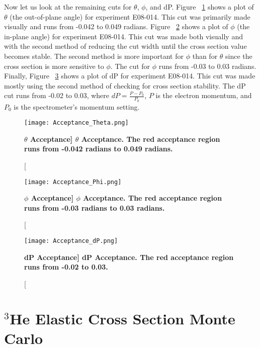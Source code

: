Now let us look at the remaining cuts for $\theta$, $\phi$, and dP. Figure ~\ref{fig:acceptance_th} shows a plot of $\theta$ (the out-of-plane angle) for experiment E08-014. This cut was primarily made visually and runs from -0.042 to 0.049 radians. Figure ~\ref{fig:acceptance_ph} shows a plot of $\phi$ (the in-plane angle) for experiment E08-014. This cut was made both visually and with the second method of reducing the cut width until the cross section value becomes stable. The second method is more important for $\phi$ than for $\theta$ since the cross section is more sensitive to $\phi$. The cut for $\phi$ runs from -0.03 to 0.03 radians. Finally, Figure ~\ref{fig:acceptance_dp} shows a plot of dP for experiment E08-014. This cut was made mostly using the second method of checking for cross section stability. The dP cut runs from -0.02 to 0.03, where $dP = \frac{P-P_0}{P_0}$, $P$ is the electron momentum, and $P_0$ is the spectrometer's momentum setting.

\begin{figure}[!ht]
\begin{center}
\texttt{[image: Acceptance\_Theta.png]}
\end{center}
\caption[\bf{$\theta$ Acceptance}]{
{\bf{$\theta$ Acceptance.}} The red acceptance region runs from -0.042 radians to 0.049 radians.}
\label{fig:acceptance_th}
\end{figure}

\begin{figure}[!ht]
\begin{center}
\texttt{[image: Acceptance\_Phi.png]}
\end{center}
\caption[\bf{$\phi$ Acceptance}]{
{\bf{$\phi$ Acceptance.}} The red acceptance region runs from -0.03 radians to 0.03 radians.}
\label{fig:acceptance_ph}
\end{figure}

\begin{figure}[!ht]
\begin{center}
\texttt{[image: Acceptance\_dP.png]}
\end{center}
\caption[\bf{dP Acceptance}]{
{\bf{dP Acceptance.}} The red acceptance region runs from -0.02 to 0.03.}
\label{fig:acceptance_dp}
\end{figure}

\section{$^3$He Elastic Cross Section Monte Carlo}
\label{sec:simc}

